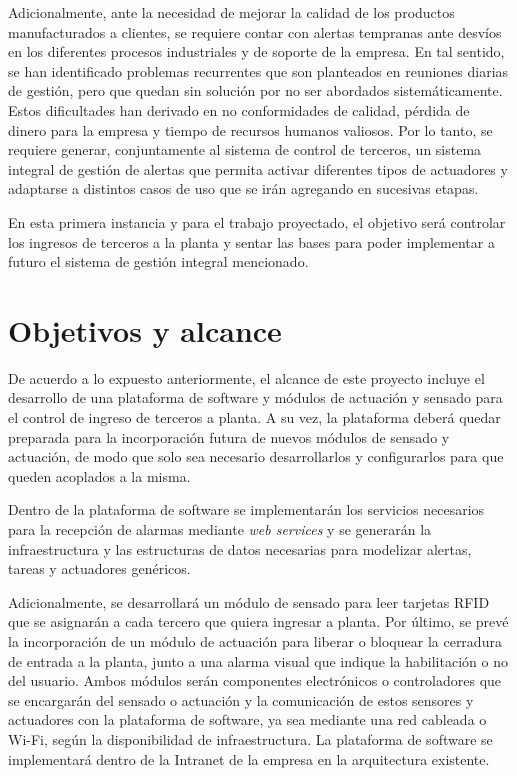 Adicionalmente, ante la necesidad de mejorar la calidad de los productos manufacturados a clientes, se requiere contar con alertas tempranas ante desvíos en los diferentes procesos industriales y de soporte de la empresa. En tal sentido, se han identificado problemas recurrentes que son planteados en reuniones diarias de gestión, pero que quedan sin solución por no ser abordados sistemáticamente. Estos dificultades han derivado en no conformidades de calidad, pérdida de dinero para la empresa y tiempo de recursos humanos valiosos. Por lo tanto, se requiere generar, conjuntamente al sistema de control de terceros, un sistema integral de gestión de alertas que permita activar diferentes tipos de actuadores y adaptarse a distintos casos de uso que se irán agregando en sucesivas etapas. 

En esta primera instancia y para el trabajo proyectado, el objetivo será controlar los ingresos de terceros a la planta y sentar las bases para poder implementar a futuro el sistema de gestión integral mencionado.


\section{Objetivos y alcance}

De acuerdo a lo expuesto anteriormente, el alcance de este proyecto incluye el desarrollo de una plataforma de software y módulos de actuación y sensado para el control de ingreso de terceros a planta. A su vez, la plataforma deberá quedar preparada para la incorporación futura de nuevos módulos de sensado y actuación, de modo que solo sea necesario desarrollarlos y configurarlos para que queden acoplados a la misma.

Dentro de la plataforma de software se implementarán los servicios necesarios para la recepción de alarmas mediante \textit{web services} y se generarán la infraestructura y las estructuras de datos necesarias para modelizar alertas, tareas y actuadores genéricos. 

Adicionalmente, se desarrollará un módulo de sensado para leer tarjetas RFID que se asignarán a cada tercero que quiera ingresar a planta. Por último, se prevé la incorporación de un módulo de actuación para liberar o bloquear la cerradura de entrada a la planta, junto a una alarma visual que indique la habilitación o no del usuario. Ambos módulos serán componentes electrónicos o controladores que se encargarán del sensado o actuación y la comunicación de estos sensores y actuadores con la plataforma de software, ya sea mediante una red cableada o Wi-Fi, según la disponibilidad de infraestructura. La plataforma de software se implementará dentro de la Intranet de la empresa en la arquitectura existente.


